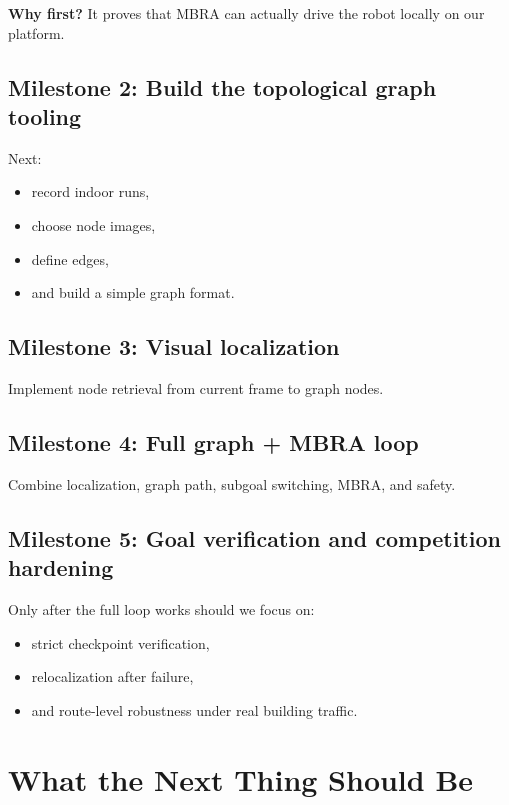 \documentclass[11pt,a4paper]{article}
\begin{document}
\textbf{Why first?} It proves that MBRA can actually drive the robot locally on
our platform.

\subsection{Milestone 2: Build the topological graph tooling}

Next:
\begin{itemize}[nosep]
  \item record indoor runs,
  \item choose node images,
  \item define edges,
  \item and build a simple graph format.
\end{itemize}

\subsection{Milestone 3: Visual localization}

Implement node retrieval from current frame to graph nodes.

\subsection{Milestone 4: Full graph + MBRA loop}

Combine localization, graph path, subgoal switching, MBRA, and safety.

\subsection{Milestone 5: Goal verification and competition hardening}

Only after the full loop works should we focus on:
\begin{itemize}[nosep]
  \item strict checkpoint verification,
  \item relocalization after failure,
  \item and route-level robustness under real building traffic.
\end{itemize}


\section{What the Next Thing Should Be}
\end{document}
